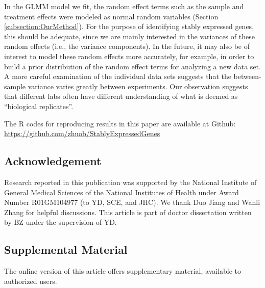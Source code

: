 			
			In the GLMM model we fit, the random effect terms such as the sample and treatment
			effects were modeled as normal random variables (Section
			\ref{subsection:OurMethod}). For the purpose of identifying stably
			expressed genes, this should be adequate, since we are mainly interested in
			the variances of these random effects (i.e., the variance components). In the
			future, it may also be of interest to model these random effects more
			accurately, for example, in order to build a prior distribution of the random
			effect terms for analyzing a new data set. A more careful examination of the
			individual data sets suggests that the between-sample variance varies greatly
			between experiments. Our observation suggests that different labs often have
			different understanding of what is deemed as ``biological replicates''.
			
			The R codes for reproducing results in this paper are available at Github:
			\url{https://github.com/zhuob/StablyExpressedGenes}
			
			\subsection*{Acknowledgement}	
			 Research reported in this publication was supported by the National Institute of 
			 General Medical Sciences of the National Institutes of Health under Award Number 
			 R01GM104977 (to YD, SCE, and JHC). We thank Duo Jiang and Wanli Zhang for helpful 
			 discussions. This article is part of doctor dissertation written by BZ under the 
			 supervision of YD. 
			
			\subsection*{Supplemental Material}The online version of this article offers 
			supplementary material,
			available to authorized users.
			
			
			\newpage
